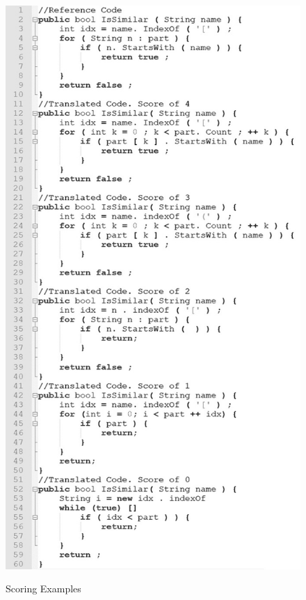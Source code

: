 \begin{figure}
\caption{Scoring Examples}
\centering
\includegraphics{img/scoreExamples}
\label{fig:scoreEG}
\end{figure}


